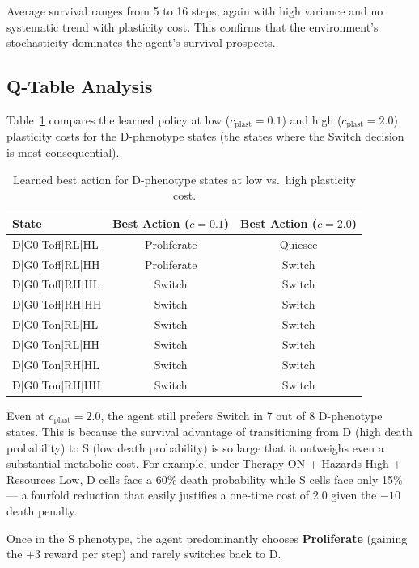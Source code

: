 \documentclass[12pt,a4paper]{article}
\begin{document}
Average survival ranges from 5 to 16 steps, again with high variance and no systematic trend with plasticity cost. This confirms that the environment's stochasticity dominates the agent's survival prospects.

\subsection{Q-Table Analysis}

Table~\ref{tab:qtable_comparison} compares the learned policy at low ($c_{\text{plast}} = 0.1$) and high ($c_{\text{plast}} = 2.0$) plasticity costs for the D-phenotype states (the states where the Switch decision is most consequential).

\begin{table}[H]
\centering
\caption{Learned best action for D-phenotype states at low vs.\ high plasticity cost.}
\label{tab:qtable_comparison}
\begin{tabular}{lcc}
\toprule
\textbf{State} & \textbf{Best Action ($c=0.1$)} & \textbf{Best Action ($c=2.0$)} \\
\midrule
D|G0|Toff|RL|HL & Proliferate & Quiesce \\
D|G0|Toff|RL|HH & Proliferate & Switch \\
D|G0|Toff|RH|HL & Switch & Switch \\
D|G0|Toff|RH|HH & Switch & Switch \\
D|G0|Ton|RL|HL  & Switch & Switch \\
D|G0|Ton|RL|HH  & Switch & Switch \\
D|G0|Ton|RH|HL  & Switch & Switch \\
D|G0|Ton|RH|HH  & Switch & Switch \\
\bottomrule
\end{tabular}
\end{table}

Even at $c_{\text{plast}} = 2.0$, the agent still prefers Switch in 7 out of 8 D-phenotype states. This is because the survival advantage of transitioning from D (high death probability) to S (low death probability) is so large that it outweighs even a substantial metabolic cost. For example, under Therapy ON + Hazards High + Resources Low, D cells face a 60\% death probability while S cells face only 15\% --- a fourfold reduction that easily justifies a one-time cost of 2.0 given the $-10$ death penalty.

Once in the S phenotype, the agent predominantly chooses \textbf{Proliferate} (gaining the $+3$ reward per step) and rarely switches back to D.
\end{document}
